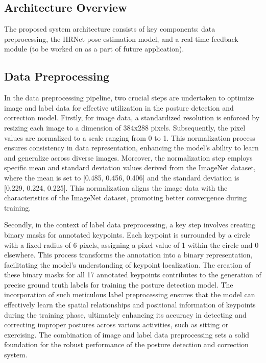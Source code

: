 \documentclass{article}
\begin{document}
\subsection{Architecture Overview}
The proposed system architecture consists of key components: data preprocessing, the HRNet pose estimation model, and a real-time feedback module (to be worked on as a part of future application).

\subsection{Data Preprocessing}
In the data preprocessing pipeline, two crucial steps are undertaken to optimize image and label data for effective utilization in the posture detection and correction model. Firstly, for image data, a standardized resolution is enforced by resizing each image to a dimension of 384x288 pixels. Subsequently, the pixel values are normalized to a scale ranging from 0 to 1. This normalization process ensures consistency in data representation, enhancing the model's ability to learn and generalize across diverse images. Moreover, the normalization step employs specific mean and standard deviation values derived from the ImageNet dataset, where the mean is set to [0.485, 0.456, 0.406] and the standard deviation is [0.229, 0.224, 0.225]. This normalization aligns the image data with the characteristics of the ImageNet dataset, promoting better convergence during training.

Secondly, in the context of label data preprocessing, a key step involves creating binary masks for annotated keypoints. Each keypoint is surrounded by a circle with a fixed radius of 6 pixels, assigning a pixel value of 1 within the circle and 0 elsewhere. This process transforms the annotation into a binary representation, facilitating the model's understanding of keypoint localization. The creation of these binary masks for all 17 annotated keypoints contributes to the generation of precise ground truth labels for training the posture detection model. The incorporation of such meticulous label preprocessing ensures that the model can effectively learn the spatial relationships and positional information of keypoints during the training phase, ultimately enhancing its accuracy in detecting and correcting improper postures across various activities, such as sitting or exercising. The combination of image and label data preprocessing sets a solid foundation for the robust performance of the posture detection and correction system.
\end{document}
